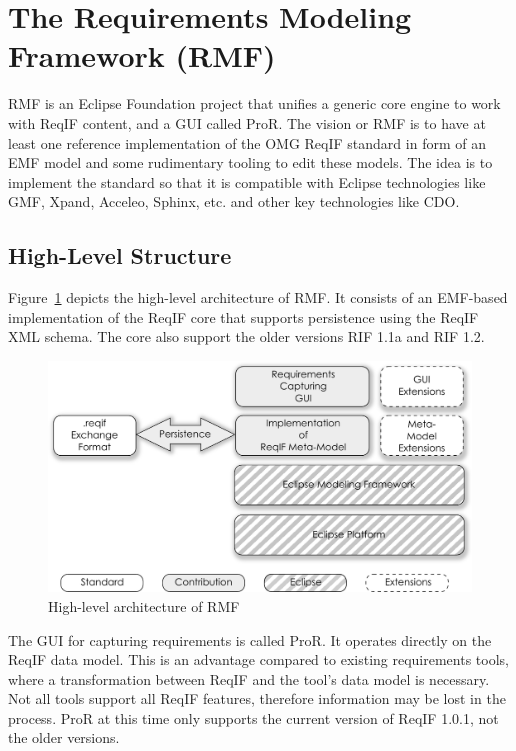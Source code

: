 \documentclass{template/openetcs_report}
\begin{document}
\section{The Requirements Modeling Framework (RMF)}

RMF is an Eclipse Foundation project that unifies a generic core engine to work with ReqIF content, and a GUI called ProR.  The vision or RMF is to have at least one reference implementation of the OMG ReqIF standard in form of an EMF model and some rudimentary tooling to edit these models. The idea is to implement the standard so that it is compatible with Eclipse technologies like GMF, Xpand, Acceleo, Sphinx, etc. and other key technologies like CDO.

\subsection{High-Level Structure}

Figure~\ref{fig:architecture} depicts the high-level architecture of RMF. It consists of an EMF-based implementation of the ReqIF core that supports persistence using the ReqIF XML schema.  The core also support the older versions RIF 1.1a and RIF 1.2.

\begin{figure}[h!t]
	\begin{center}
	\includegraphics[width=.8\textwidth]{img/architecture.pdf}
	\end{center}
	\caption{High-level architecture of RMF}
	\label{fig:architecture}
\end{figure}

The GUI for capturing requirements is called ProR.  It operates directly on the ReqIF data model.  This is an advantage compared to existing requirements tools, where a transformation between ReqIF and the tool's data model is necessary.  Not all tools support all ReqIF features, therefore information may be lost in the process.  ProR at this time only supports the current version of ReqIF 1.0.1, not the older versions.
\end{document}
